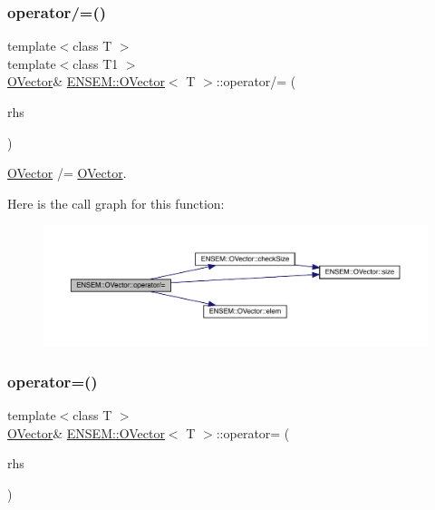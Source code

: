 \subsubsection{\texorpdfstring{operator/=()}{operator/=()}\hspace{0.1cm}{\footnotesize\ttfamily [6/6]}}
{\footnotesize\ttfamily template$<$class T $>$ \\
template$<$class T1 $>$ \\
\mbox{\hyperlink{classENSEM_1_1OVector}{O\+Vector}}\& \mbox{\hyperlink{classENSEM_1_1OVector}{E\+N\+S\+E\+M\+::\+O\+Vector}}$<$ T $>$\+::operator/= (\begin{DoxyParamCaption}\item[{const \mbox{\hyperlink{classENSEM_1_1OVector}{O\+Vector}}$<$ T1 $>$ \&}]{rhs }\end{DoxyParamCaption})\hspace{0.3cm}{\ttfamily [inline]}}



\mbox{\hyperlink{classENSEM_1_1OVector}{O\+Vector}} /= \mbox{\hyperlink{classENSEM_1_1OVector}{O\+Vector}}. 

Here is the call graph for this function\+:
\nopagebreak
\begin{figure}[H]
\begin{center}
\leavevmode
\includegraphics[width=350pt]{d0/d8d/classENSEM_1_1OVector_a61d1911393adf46629dd493ef09c1022_cgraph}
\end{center}
\end{figure}
\mbox{\label{classENSEM_1_1OVector_a54123bea722ddb2b3eaea0c948735b13}} 
\subsubsection{\texorpdfstring{operator=()}{operator=()}\hspace{0.1cm}{\footnotesize\ttfamily [1/12]}}
{\footnotesize\ttfamily template$<$class T $>$ \\
\mbox{\hyperlink{classENSEM_1_1OVector}{O\+Vector}}\& \mbox{\hyperlink{classENSEM_1_1OVector}{E\+N\+S\+E\+M\+::\+O\+Vector}}$<$ T $>$\+::operator= (\begin{DoxyParamCaption}\item[{const \mbox{\hyperlink{structENSEM_1_1Zero}{Zero}} \&}]{rhs }\end{DoxyParamCaption})\hspace{0.3cm}{\ttfamily [inline]}}



